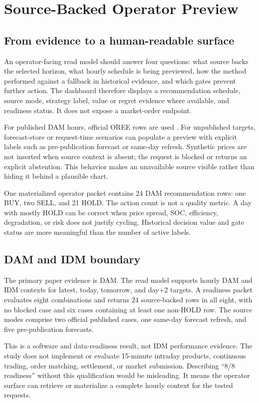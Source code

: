 \section{Source-Backed Operator Preview}

\subsection{From evidence to a human-readable surface}

An operator-facing read model should answer four questions: what source backs the selected horizon, what hourly schedule is being previewed, how the method performed against a fallback in historical evidence, and which gates prevent further action. The dashboard therefore displays a recommendation schedule, source mode, strategy label, value or regret evidence where available, and readiness status. It does not expose a market-order endpoint.

For published DAM hours, official OREE rows are used \cite{oree2026dam}. For unpublished targets, forecast-store or request-time scenarios can populate a preview with explicit labels such as pre-publication forecast or same-day refresh. Synthetic prices are not inserted when source context is absent; the request is blocked or returns an explicit abstention. This behavior makes an unavailable source visible rather than hiding it behind a plausible chart.

One materialized operator packet contains 24 DAM recommendation rows: one BUY, two SELL, and 21 HOLD. The action count is not a quality metric. A day with mostly HOLD can be correct when price spread, SOC, efficiency, degradation, or risk does not justify cycling. Historical decision value and gate status are more meaningful than the number of active labels.

\subsection{DAM and IDM boundary}

The primary paper evidence is DAM. The read model supports hourly DAM and IDM contexts for latest, today, tomorrow, and day+2 targets. A readiness packet evaluates eight combinations and returns 24 source-backed rows in all eight, with no blocked case and six cases containing at least one non-HOLD row. The source modes comprise two official published cases, one same-day forecast refresh, and five pre-publication forecasts.

This is a software and data-readiness result, not IDM performance evidence. The study does not implement or evaluate 15-minute intraday products, continuous trading, order matching, settlement, or market submission. Describing ``8/8 readiness'' without this qualification would be misleading. It means the operator surface can retrieve or materialize a complete hourly context for the tested requests.

